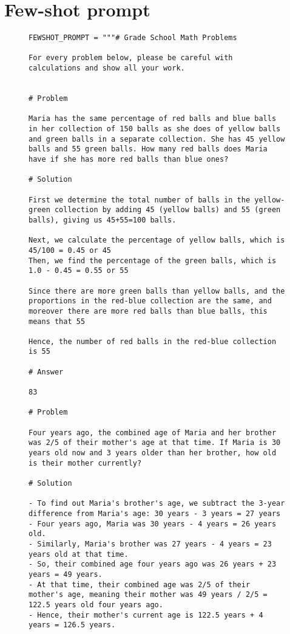\documentclass{article}
\begin{document}
\section{Few-shot prompt}\label{sec:app:fewshot-prompt}
\begin{figure}[h]
    \centering

\tiny
\begin{verbatim}
FEWSHOT_PROMPT = """# Grade School Math Problems

For every problem below, please be careful with calculations and show all your work.


# Problem

Maria has the same percentage of red balls and blue balls in her collection of 150 balls as she does of yellow balls and green balls in a separate collection. She has 45 yellow balls and 55 green balls. How many red balls does Maria have if she has more red balls than blue ones?

# Solution

First we determine the total number of balls in the yellow-green collection by adding 45 (yellow balls) and 55 (green balls), giving us 45+55=100 balls.

Next, we calculate the percentage of yellow balls, which is 45/100 = 0.45 or 45
Then, we find the percentage of the green balls, which is 1.0 - 0.45 = 0.55 or 55

Since there are more green balls than yellow balls, and the proportions in the red-blue collection are the same, and moreover there are more red balls than blue balls, this means that 55

Hence, the number of red balls in the red-blue collection is 55

# Answer

83

# Problem

Four years ago, the combined age of Maria and her brother was 2/5 of their mother's age at that time. If Maria is 30 years old now and 3 years older than her brother, how old is their mother currently?

# Solution

- To find out Maria's brother's age, we subtract the 3-year difference from Maria's age: 30 years - 3 years = 27 years
- Four years ago, Maria was 30 years - 4 years = 26 years old.
- Similarly, Maria's brother was 27 years - 4 years = 23 years old at that time.
- So, their combined age four years ago was 26 years + 23 years = 49 years.
- At that time, their combined age was 2/5 of their mother's age, meaning their mother was 49 years / 2/5 = 122.5 years old four years ago.
- Hence, their mother's current age is 122.5 years + 4 years = 126.5 years.


\end{verbatim}
\end{figure}
\end{document}
